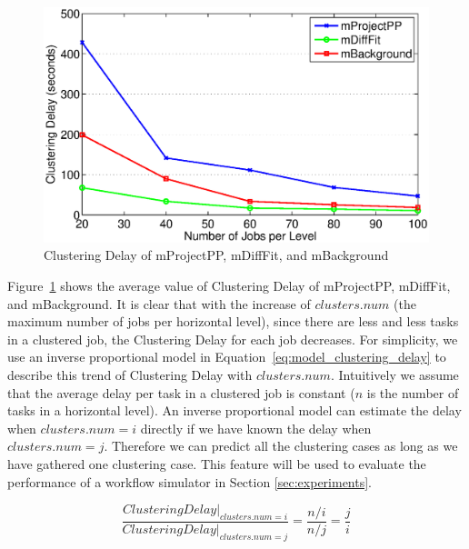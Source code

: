 \begin{figure}
  \centering
  \includegraphics[width=0.7\linewidth]{figures/model/montage_clustering_delay.eps}
    \caption{Clustering Delay of mProjectPP, mDiffFit, and mBackground}
    \label{fig:model_montage_clustering}
\end{figure}





Figure~\ref{fig:model_montage_clustering} shows the average value of Clustering Delay of mProjectPP, mDiffFit, and mBackground. It is clear that with the increase of $clusters.num$ (the maximum number of jobs per horizontal level), since there are less and less tasks in a clustered job, the Clustering Delay for each job decreases. For simplicity, we use an inverse proportional model in Equation~\ref{eq:model_clustering_delay} to describe this trend of Clustering Delay with $clusters.num$. Intuitively we assume that the average delay per task in a clustered job is constant ($n$ is the number of tasks in a horizontal level). An inverse proportional model can estimate the delay when $clusters.num=i$ directly if we have known the delay when $clusters.num=j$. Therefore we can predict all the clustering cases as long as we have gathered one clustering case. This feature will be used to evaluate the performance of a workflow simulator in Section \ref{sec:experiments}. 

\begin{equation} \label{eq:model_clustering_delay}
\frac{Clustering Delay|_{clusters.num=i}}{Clustering Delay|_{clusters.num=j}}=\frac{n/i}{n/j}=\frac{j}{i}
\end{equation}




